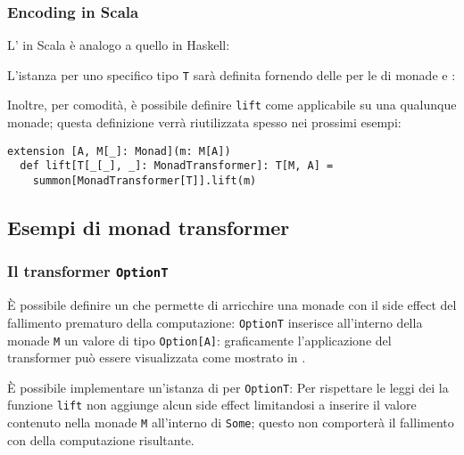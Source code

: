 \subsubsection{Encoding in Scala}
L' in Scala è analogo a quello in Haskell:

L'istanza per uno specifico tipo \lstinline{T} sarà definita fornendo delle  per le  di monade e :

Inoltre, per comodità, è possibile definire \lstinline{lift} come  applicabile su una qualunque monade; questa definizione verrà riutilizzata spesso nei prossimi esempi:
\begin{lstlisting}[language=scala3]
extension [A, M[_]: Monad](m: M[A])
  def lift[T[_[_], _]: MonadTransformer]: T[M, A] =
    summon[MonadTransformer[T]].lift(m)
\end{lstlisting}

\subsection{Esempi di monad transformer}
\subsubsection{Il transformer \lstinline{OptionT}}
È possibile definire un  che permette di arricchire una monade con il side effect del fallimento prematuro della computazione:
\lstinline{OptionT} inserisce all'interno della monade \lstinline{M} un valore di tipo \lstinline{Option[A]}: graficamente l'applicazione del transformer può essere visualizzata come mostrato in .



È possibile implementare un'istanza di  per \lstinline{OptionT}:
Per rispettare le leggi dei  la funzione \lstinline{lift} non aggiunge alcun side effect limitandosi a inserire il valore contenuto nella monade \lstinline{M} all'interno di \lstinline{Some}; questo non comporterà il fallimento con  della computazione risultante.

